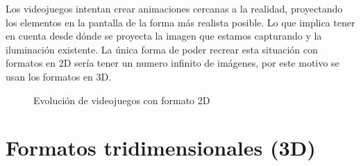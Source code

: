 Los videojuegos intentan crear animaciones cercanas a la realidad, proyectando los elementos en la pantalla de la forma más realista posible. Lo que implica tener en cuenta desde dónde se proyecta la imagen que estamos capturando y la iluminación existente. La única forma de poder recrear esta situación con formatos en 2D sería tener un numero infinito de imágenes, por este motivo se usan los formatos en 3D.

	\begin{figure}[h]
	\centering	

	\caption{Evolución de videojuegos con formato 2D}
	\end{figure}


\section{Formatos tridimensionales (3D)}

